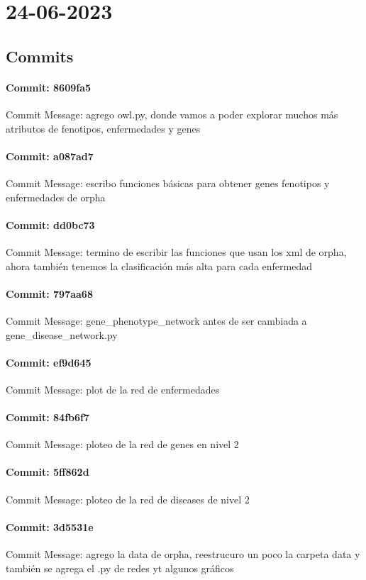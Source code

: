 \documentclass{article}
\begin{document}
\section{24-06-2023}
\subsection{Commits}
\paragraph{Commit: 8609fa5}
Commit Message: agrego owl.py, donde vamos a poder explorar muchos más atributos de fenotipos, enfermedades y genes

\paragraph{Commit: a087ad7}
Commit Message: escribo funciones básicas para obtener genes fenotipos y enfermedades de orpha

\paragraph{Commit: dd0bc73}
Commit Message: termino de escribir las funciones que usan los xml de orpha, ahora también tenemos la clasificación más alta para cada enfermedad

\paragraph{Commit: 797aa68}
Commit Message: gene_phenotype_network antes de ser cambiada a gene_disease_network.py

\paragraph{Commit: ef9d645}
Commit Message: plot de la red de enfermedades

\paragraph{Commit: 84fb6f7}
Commit Message: ploteo de la red de genes en nivel 2

\paragraph{Commit: 5ff862d}
Commit Message: ploteo de la red de diseases de nivel 2

\paragraph{Commit: 3d5531e}
Commit Message: agrego la data de orpha, reestrucuro un poco la carpeta data y también se agrega el .py de redes yt algunos gráficos
\end{document}
